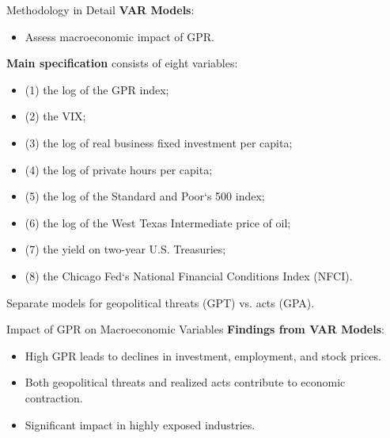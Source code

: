 \documentclass[11pt]{beamer}
\begin{document}
\begin{frame}{Methodology in Detail}
\textbf{VAR Models}:

	\begin{itemize}
		\item Assess macroeconomic impact of GPR.

	\end{itemize}
\textbf{Main specification} consists of eight variables: 

	\begin{itemize}
		\item (1) the log of the GPR index;

		\item (2) the VIX; 

		\item (3) the log of real business fixed investment per capita; 

		\item (4) the log of private hours per capita; 

		\item (5) the log of the Standard and Poor`s 500 index; 

		\item (6) the log of the West Texas Intermediate price of oil; 

		\item (7) the yield on two-year U.S. Treasuries; 

		\item (8) the Chicago Fed`s National Financial Conditions Index (NFCI).

	\end{itemize}
Separate models for geopolitical threats (GPT) vs. acts (GPA).
\end{frame}
\begin{frame}{Impact of GPR on Macroeconomic Variables}
\textbf{Findings from VAR Models}:

	\begin{itemize}
		\item High GPR leads to declines in investment, employment, and stock prices.

		\item Both geopolitical threats and realized acts contribute to economic contraction.

		\item Significant impact in highly exposed industries.
	\end{itemize}
\end{frame}
\end{document}
